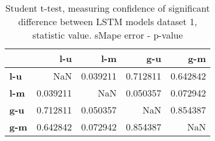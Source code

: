 \begin{table}[h]
\centering
\caption{Student t-test, measuring confidence of significant difference between LSTM models dataset 1, statistic value. sMape error - p-value}
\label{table:ttest-p-values-lstm-experiments-sMAPE-dataset-1}
\begin{tabular}{lrrrr}
\toprule
{} &       l-u &       l-m &       g-u &       g-m \\
\midrule
\textbf{l-u} &       NaN &  0.039211 &  0.712811 &  0.642842 \\
\textbf{l-m} &  0.039211 &       NaN &  0.050357 &  0.072942 \\
\textbf{g-u} &  0.712811 &  0.050357 &       NaN &  0.854387 \\
\textbf{g-m} &  0.642842 &  0.072942 &  0.854387 &       NaN \\
\bottomrule
\end{tabular}
\end{table}
